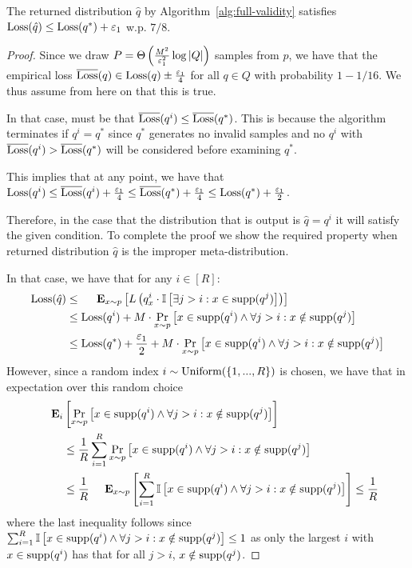 \begin{lemma}\label{lem:full-validity-loss}
The returned distribution $\hat q$ by Algorithm~\ref{alg:full-validity} satisfies $\text{Loss}(\hat q) \le \text{Loss}(q^*) + \varepsilon_1$ w.p. $7/8$.
\end{lemma}
\begin{proof}
  Since we draw $P=\Theta\left(\frac{M^2}{\varepsilon_1^2} \log |Q| \right)$ samples from $p$, we have that the empirical loss $\overline {\text{Loss}}(q) \in \text{Loss}(q) \pm \frac {\varepsilon_1} 4$ for all $q \in Q$ with probability $1-1/16$. We thus assume from here on that this is true.
  
  In that case, must be that $\overline {\text{Loss}}(q^i) \le \overline {\text{Loss}}(q^*)$. This is because the algorithm terminates if $q^i = q^*$ since $q^*$ generates no invalid samples and no $q^i$ with $\overline {\text{Loss}}(q^i) > \overline {\text{Loss}}(q^*)$ will be considered before examining $q^*$.
  
  This implies that at any point, we have that $\text{Loss}(q^i) \le \overline {\text{Loss}}(q^i) + \frac {\varepsilon_1} 4 \le \overline {\text{Loss}}(q^*) + \frac {\varepsilon_1} 4 \le \text{Loss}(q^*) + \frac {\varepsilon_1} 2$. 
  
  Therefore, in the case that the distribution that is output is $\hat q = q^i$ it will satisfy the given condition.
  To complete the proof we show the required property when returned distribution $\hat q$ is the improper meta-distribution.
  
  In that case, we have that for any $i \in [R]$:
    \begin{align*}
      \Loss(\hat q) 
  &\le \Exp_{x\sim p}\left[ L\left(q_x^i \cdot \Ind\left[\exists j > i: x \in \Supp(q^j) \right] \right) \right] \\
  &\le \Loss(q^i) + M \cdot \Pr_{x\sim p}\left[ x \in \Supp(q^i) \wedge \forall j > i: x \notin \Supp(q^j) \right] \\
  &\le \Loss(q^*) + \frac {\eps_1} 2 + M \cdot \Pr_{x\sim p}\left[ x \in \Supp(q^i) \wedge \forall j > i: x \notin \Supp(q^j) \right]
    \end{align*}
However, since a random index $i \sim \text{Uniform}(\{1,...,R\})$ is chosen, we have that in expectation over this random choice
    \begin{align*}
\Exp_i&\left[ \Pr_{x\sim p}\left[ x \in \Supp(q^i) \wedge \forall j > i: x \notin \Supp(q^j) \right] \right] \\
&\le \frac 1 R \sum_{i=1}^R \Pr_{x\sim p}\left[ x \in \Supp(q^i) \wedge \forall j > i: x \notin \Supp(q^j) \right] \\
&\le \frac 1 R \Exp_{x\sim p} \left[ \sum_{i=1}^R \Ind\left[ x \in \Supp(q^i) \wedge \forall j > i: x \notin \Supp(q^j) \right] \right] 
\le \frac 1 R
   \end{align*}
  where the last inequality follows since $\sum_{i=1}^R \mathbb{I}\left[ x \in \text{supp}(q^i) \wedge \forall j > i: x \notin \text{supp}(q^j) \right] \le 1 $ as only the largest $i$ with $x \in \text{supp}(q^i)$ has that for all $j > i$, $x \notin \text{supp}(q^j)$.


\end{proof}
